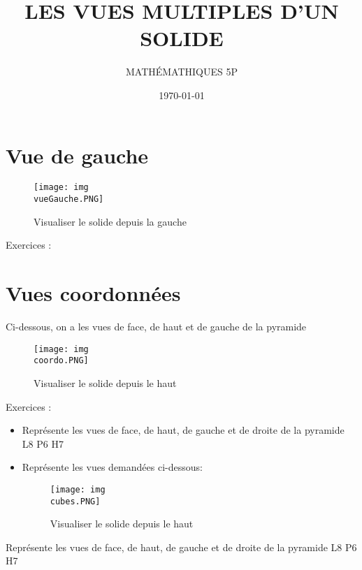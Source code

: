 \documentclass[a4paper, 12 pt]{article}
\title{\LARGE \textbf{LES VUES MULTIPLES D'UN SOLIDE}}
\author{MATH\'EMATHIQUES 5P}
\date{\today}
\begin{document}
    \Large
    

    \begin{titlepage}
        
        \maketitle
    \end{titlepage}
    
    \setcounter{page}{2}



    \section{Vue de gauche}

        \begin{figure}[H]
            \centering
            \texttt{[image: img\\vueGauche.PNG]}
            \caption[]{Visualiser le solide depuis la gauche}
        \end{figure}

    
    Exercices :

   \newpage
   \section{Vues coordonnées}
   Ci-dessous, on a les vues de face, de haut et de gauche de la pyramide
        \begin{figure}[H]
            \centering
            \texttt{[image: img\\coordo.PNG]}
            \caption[]{Visualiser le solide depuis le haut}
        \end{figure}

    Exercices :\begin{itemize}
        \item Représente les vues de face, de haut, de gauche et de droite de la pyramide L8 P6 H7
        \item Représente les vues demandées ci-dessous: \begin{figure}[H]
            \centering
            \texttt{[image: img\\cubes.PNG]}
            \caption[]{Visualiser le solide depuis le haut}
        \end{figure}
        
    \end{itemize}
    Représente les vues de face, de haut, de gauche et de droite de la pyramide L8 P6 H7
    
\end{document}
